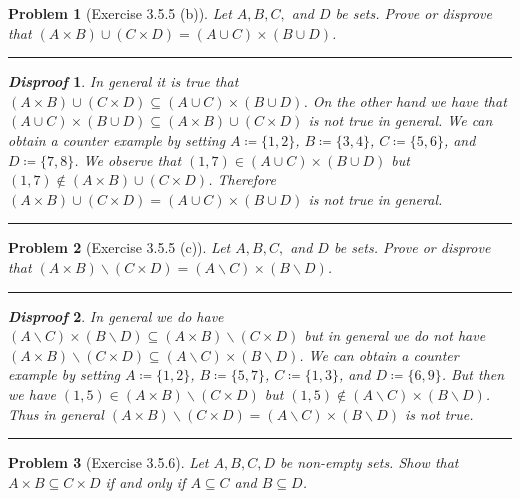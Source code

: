 \documentclass{article}
\newcommand{\lined}{\noindent\rule{\textwidth}{1pt}}
\newtheorem*{problem}{Problem}
\newtheorem*{disproof}{\emph{Disproof}}
\begin{document}
	\newpage
	
	\begin{problem}[Exercise 3.5.5 (b)]
		Let $A,B,C,$ and $D$ be sets. Prove or disprove that $(A \times B) \cup (C \times D) = (A \cup C) \times (B \cup D)$.
	\end{problem}
	
	\lined
	\begin{disproof}
		In general it is true that $(A \times B) \cup (C \times D) \subseteq (A \cup C) \times (B \cup D)$. On the other hand we have that
		$(A \cup C) \times (B \cup D) \subseteq (A \times B) \cup (C \times D)$ is not true in general.  We can obtain a counter example by setting $A \coloneqq \{1,2\}$, $B \coloneqq \{3,4\}$, $C \coloneqq \{5,6\}$, and $D \coloneqq \{7,8\}$. We observe that $(1,7) \in (A \cup C) \times (B \cup D)$ but  $(1,7) \notin (A \times B) \cup (C \times D)$. Therefore $(A \times B) \cup (C \times D) = (A \cup C) \times (B \cup D)$ is not true in general.
	\end{disproof}
	\lined
	
	\newpage
	
	\begin{problem}[Exercise 3.5.5 (c)]
		Let $A,B,C,$ and $D$ be sets. Prove or disprove that $(A \times B) \backslash (C \times D) = (A \backslash C) \times (B \backslash D)$.
	\end{problem}

	\lined
	\begin{disproof}
		In general we do have $(A \backslash C) \times (B \backslash D) \subseteq (A \times B) \backslash (C \times D)$ but in general we do not have $(A \times B) \backslash (C \times D) \subseteq (A \backslash C) \times (B \backslash D)$. We can obtain a counter example by setting $A \coloneqq \{1,2\}$, $B \coloneqq \{5,7\}$, $C \coloneqq \{1,3\}$, and $D \coloneqq \{6,9\}$. But then we have $(1,5) \in (A \times B) \backslash (C \times D)$ but $(1,5) \notin (A \backslash C) \times (B \backslash D)$. Thus in general
		$(A \times B) \backslash (C \times D) = (A \backslash C) \times (B \backslash D)$ is not true. 
	\end{disproof}
	\lined
	
	\newpage
	
	\begin{problem}[Exercise 3.5.6]
		Let $A,B,C,D$ be non-empty sets. Show that $A \times B \subseteq C \times D$ if and only if $A \subseteq C$ and $B \subseteq
		D$.
	\end{problem}
\end{document}
